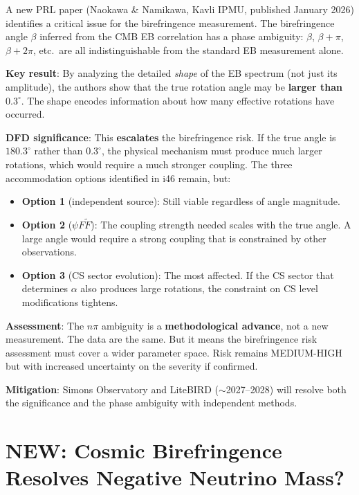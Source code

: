 \documentclass[11pt,a4paper]{article}
\newcommand{\NEW}{\textcolor{dfdblue}{\textbf{NEW}}}
\begin{document}
\begin{tcolorbox}[colback=red!5!white, colframe=red!60!black,
  title={\NEW: $n\pi$ Phase Ambiguity of Cosmic Birefringence --- PRL Published (2026)}]

A new PRL paper (Naokawa \& Namikawa, Kavli IPMU, published January 2026) identifies a critical issue for the birefringence measurement. The birefringence angle $\beta$ inferred from the CMB EB correlation has a phase ambiguity: $\beta$, $\beta + \pi$, $\beta + 2\pi$, etc.\ are all indistinguishable from the standard EB measurement alone.

\textbf{Key result}: By analyzing the detailed \emph{shape} of the EB spectrum (not just its amplitude), the authors show that the true rotation angle may be \textbf{larger than $0.3^\circ$}. The shape encodes information about how many effective rotations have occurred.

\textbf{DFD significance}: This \textbf{escalates} the birefringence risk. If the true angle is $180.3^\circ$ rather than $0.3^\circ$, the physical mechanism must produce much larger rotations, which would require a much stronger coupling. The three accommodation options identified in i46 remain, but:
\begin{itemize}
\item \textbf{Option 1} (independent source): Still viable regardless of angle magnitude.
\item \textbf{Option 2} ($\psi F \tilde{F}$): The coupling strength needed scales with the true angle. A large angle would require a strong coupling that is constrained by other observations.
\item \textbf{Option 3} (CS sector evolution): The most affected. If the CS sector that determines $\alpha$ also produces large rotations, the constraint on CS level modifications tightens.
\end{itemize}

\textbf{Assessment}: The $n\pi$ ambiguity is a \textbf{methodological advance}, not a new measurement. The data are the same. But it means the birefringence risk assessment must cover a wider parameter space. Risk remains MEDIUM-HIGH but with increased uncertainty on the severity if confirmed.

\textbf{Mitigation}: Simons Observatory and LiteBIRD ($\sim$2027--2028) will resolve both the significance and the phase ambiguity with independent methods.
\end{tcolorbox}

\section{\NEW: Cosmic Birefringence Resolves Negative Neutrino Mass?}
\end{document}
